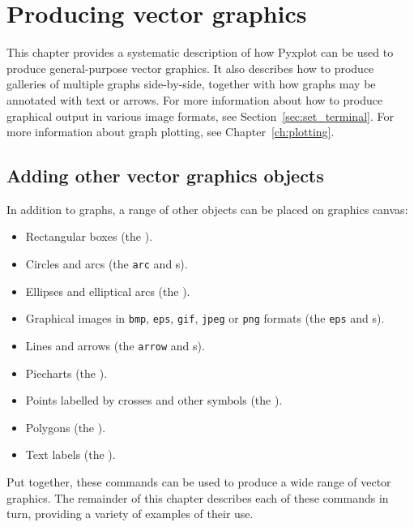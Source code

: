 %
%
%
%
%



\chapter{Producing vector graphics}
\label{ch:vector_graphics}

This chapter provides a systematic description of how Pyxplot can be used to
produce general-purpose vector graphics.  It also describes how to produce
galleries of multiple graphs side-by-side, together with how graphs may be
annotated with text or arrows. For more information about how to produce
graphical output in various image formats, see Section~\ref{sec:set_terminal}.
For more information about graph plotting, see Chapter~\ref{ch:plotting}.

\section{Adding other vector graphics objects}

In addition to graphs, a range of other objects can be placed on graphics
canvas:

\begin{itemize}
\item Rectangular boxes (the ).
\item Circles and arcs (the {\tt arc} and s).
\item Ellipses and elliptical arcs (the ).
\item Graphical images in {\tt bmp}, {\tt eps}, {\tt gif}, {\tt jpeg} or {\tt png} formats (the {\tt eps} and s).
\item Lines and arrows (the {\tt arrow} and s).
\item Piecharts (the ).
\item Points labelled by crosses and other symbols (the ).
\item Polygons (the ).
\item Text labels (the ).
\end{itemize}
Put together, these commands can be used to produce a wide range of vector
graphics. The remainder of this chapter describes each of these commands in
turn, providing a variety of examples of their use.

